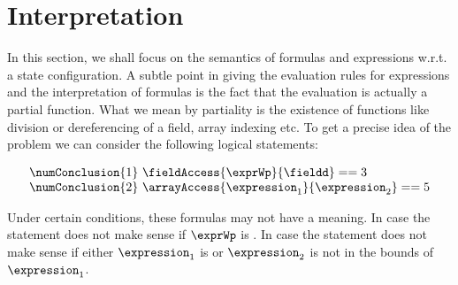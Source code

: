 
\newtheorem{interpretation}{Definition}[section]


\section{Interpretation}\label{interpret}
%
In this section, we shall focus on the semantics of formulas and expressions w.r.t. a state configuration.
A subtle point in giving the evaluation rules for expressions and the interpretation of formulas
is the fact that the evaluation is actually  a partial function.%
What we mean by partiality is the existence of functions like division or dereferencing of a field, array indexing etc. 
To get a precise idea of the problem we can consider the following logical statements: 

$$
\begin{array}{l} 
\numConclusion{1} \  \fieldAccess{\exprWp}{\fieldd} == 3\\
\numConclusion{2} \ \arrayAccess{\expression_1} {\expression_2} == 5
\end{array}
$$   

Under certain conditions, these formulas may not have a meaning. In case 
  the statement does not make sense if
$\exprWp$ is \Mynull. In case    the statement does not make sense if 
either $\expression_1 $ is \Mynull{} or $\expression_2$  is not in the bounds of $\expression_1 $.


